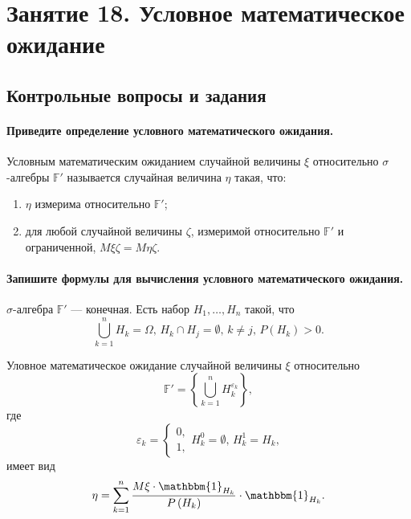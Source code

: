 \chapter*{Занятие 18. Условное математическое ожидание}

\section*{Контрольные вопросы и задания}

\subsubsection*{Приведите определение условного математического ожидания.}

Условным математическим ожиданием случайной величины $ \xi $ относительно $ \sigma $-алгебры
$ \mathbb{F'}$ называется случайная величина $ \eta $ такая, что:
\begin{enumerate}
  \item $ \eta $ измерима относительно $ \mathbb{F'}$;
  \item для любой случайной величины $ \zeta $, измеримой относительно $ \mathbb{F'}$ и ограниченной,
  $M \xi \zeta = M \eta \zeta $.
\end{enumerate}

\subsubsection*{Запишите формулы для вычисления условного математического ожидания.}

$ \sigma $-алгебра $ \mathbb{F'}$ --- конечная.
Есть набор $H_1, \dotsc, H_n$ такой, что
$$ \bigcup \limits_{k = 1}^n H_k = \Omega, \,
  H_k \cap H_j = \emptyset, \,
  k \neq j, \,
  P \left( H_k \right) > 0.$$

Уловное математическое ожидание случайной величины $ \xi $ относительно
$$ \mathbb{F'} =
  \left\{ \bigcup \limits_{k = 1}^n H_k^{ \varepsilon_k} \right\},$$
где
$$ \varepsilon_k =
  \begin{cases}
    0, \\
    1,
  \end{cases}
  H_k^0 = \emptyset, \,
  H_k^1 = H_k,$$
имеет вид
$$ \eta =
  \sum \limits_{k = 1}^n
    \frac{M \xi \cdot \mathbbm{1}_{H_k}}{P \left( H_k \right) } \cdot \mathbbm{1}_{H_k}.$$


